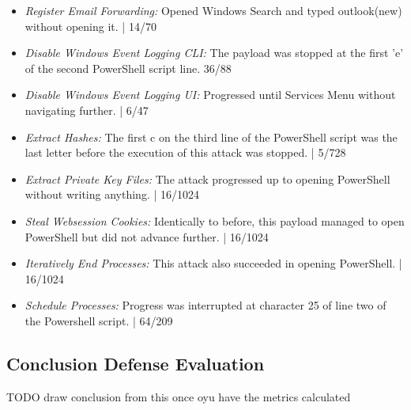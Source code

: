  \begin{itemize}
    \item  \emph{Register Email Forwarding:} Opened Windows Search and typed outlook(new) without opening it. | 14/70
    \item  \emph{Disable Windows Event Logging CLI:} The payload was stopped at the first 'e' of the second PowerShell script line. 36/88
    \item  \emph{Disable Windows Event Logging UI:} Progressed until Services Menu without navigating further. | 6/47
    \item  \emph{Extract Hashes:} The first c on the third line of the PowerShell script was the last letter before the execution of this attack was stopped. | 5/728
    \item  \emph{Extract Private Key Files:}  The attack progressed up to opening PowerShell without writing anything. | 16/1024
    \item  \emph{Steal Websession Cookies:} Identically to before, this payload managed to open PowerShell but did not advance further. | 16/1024
    \item  \emph{Iteratively End Processes:} This attack also succeeded in opening PowerShell. | 16/1024
    \item  \emph{Schedule Processes:} Progress was interrupted at character 25 of line two of the Powershell script. | 64/209
\end{itemize}


\subsection{Conclusion Defense Evaluation}

TODO draw conclusion from this once oyu have the metrics calculated


